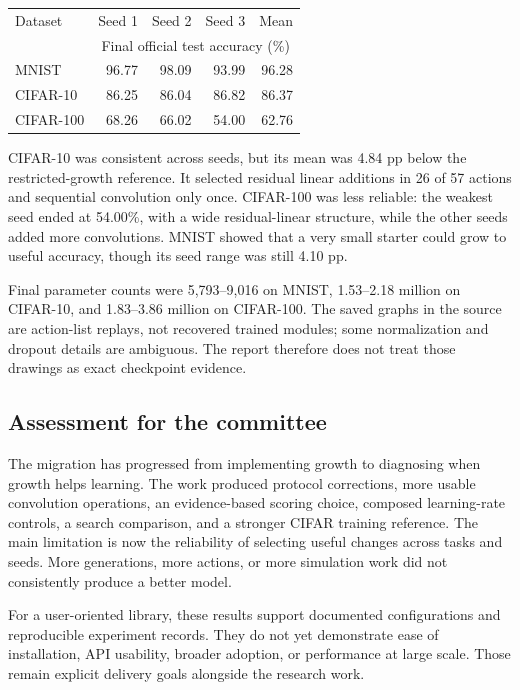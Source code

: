 \documentclass[11pt,a4paper]{article}
\begin{document}
\begin{center}
\begin{tabular}{lrrrr}\toprule
Dataset & Seed 1 & Seed 2 & Seed 3 & Mean\\
 &\multicolumn{4}{c}{Final official test accuracy (\%)}\\\midrule
MNIST &96.77&98.09&93.99&96.28\\
CIFAR-10 &86.25&86.04&86.82&86.37\\
CIFAR-100 &68.26&66.02&54.00&62.76\\\bottomrule
\end{tabular}
\end{center}

CIFAR-10 was consistent across seeds, but its mean was 4.84 pp below the restricted-growth reference. It selected residual linear additions in 26 of 57 actions and sequential convolution only once. CIFAR-100 was less reliable: the weakest seed ended at 54.00\%, with a wide residual-linear structure, while the other seeds added more convolutions. MNIST showed that a very small starter could grow to useful accuracy, though its seed range was still 4.10 pp.

Final parameter counts were 5,793--9,016 on MNIST, 1.53--2.18 million on CIFAR-10, and 1.83--3.86 million on CIFAR-100. The saved graphs in the source are action-list replays, not recovered trained modules; some normalization and dropout details are ambiguous. The report therefore does not treat those drawings as exact checkpoint evidence.

\subsection{Assessment for the committee}
The migration has progressed from implementing growth to diagnosing when growth helps learning. The work produced protocol corrections, more usable convolution operations, an evidence-based scoring choice, composed learning-rate controls, a search comparison, and a stronger CIFAR training reference. The main limitation is now the reliability of selecting useful changes across tasks and seeds. More generations, more actions, or more simulation work did not consistently produce a better model.

For a user-oriented library, these results support documented configurations and reproducible experiment records. They do not yet demonstrate ease of installation, API usability, broader adoption, or performance at large scale. Those remain explicit delivery goals alongside the research work.
\end{document}
